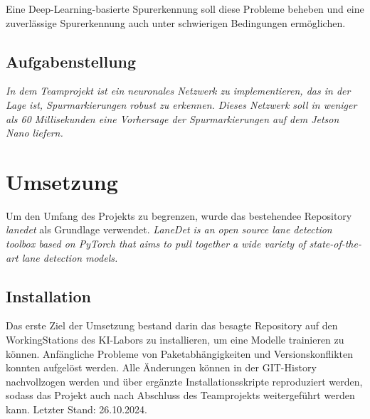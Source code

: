 \documentclass{article}
\begin{document}
            Eine Deep-Learning-basierte Spurerkennung soll diese Probleme beheben und eine zuverlässige Spurerkennung auch unter schwierigen Bedingungen ermöglichen.

 

        \subsection{Aufgabenstellung}
            \textit{In dem Teamprojekt ist ein neuronales Netzwerk zu implementieren, das in der Lage ist, Spurmarkierungen robust zu erkennen. Dieses Netzwerk soll in weniger als 60 Millisekunden eine Vorhersage der Spurmarkierungen auf dem Jetson Nano liefern.}
    \section{Umsetzung}
        Um den Umfang des Projekts zu begrenzen, wurde das bestehendee Repository \textit{lanedet} als Grundlage verwendet.
        \textit{LaneDet is an open source lane detection toolbox based on PyTorch that aims to pull together a wide variety of state-of-the-art lane detection models.}

        \subsection{Installation}
            Das erste Ziel der Umsetzung bestand darin das besagte Repository auf den WorkingStations des KI-Labors zu installieren, um eine Modelle trainieren zu können.
            Anfängliche Probleme von Paketabhängigkeiten und Versionskonflikten konnten aufgelöst werden. 
            Alle Änderungen können in der GIT-History nachvollzogen werden und über ergänzte Installationsskripte reproduziert werden, sodass das Projekt auch nach Abschluss des Teamprojekts weitergeführt werden kann. Letzter Stand: 26.10.2024. %
\end{document}
